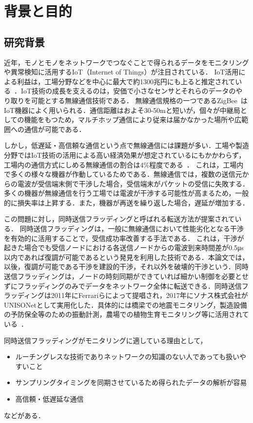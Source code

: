 \chapter{背景と目的}

\section{研究背景}
近年，モノとモノをネットワークでつなぐことで得られるデータをモニタリングや異常検知に活用するIoT（Internet of Things）が注目されている．
IoT活用による利益は，工場分野などを中心に最大で約1300兆円にも上ると推定されている~\cite{IoT}．IoT技術の成長を支えるのは，安価で小さなセンサとそれらのデータのやり取りを可能とする無線通信技術である．
無線通信規格の一つであるZigBee~\cite{zigbee}はIoT機器によく用いられる．通信距離はおよそ30-50\si{\metre}と短いが，個々が中継局としての機能をもつため，マルチホップ通信により従来は届かなかった場所や広範囲への通信が可能である．


しかし，低遅延・高信頼な通信という点で無線通信には課題が多い．工場や製造分野ではIoT技術の活用による高い経済効果が想定されているにもかかわらず，工場内の通信方式にしめる無線通信の割合は4\%程度である~\cite{IoT}．
これは，工場内で多くの様々な機器が作動しているためである．無線通信では，複数の送信元からの電波が受信端末側で干渉した場合，受信端末がパケットの受信に失敗する．多くの機器が無線通信を行う工場では電波が干渉する可能性が高まるため，一般的に損失率は上昇する．また，機器が再送を繰り返した場合，遅延が増加する．

この問題に対し，同時送信フラッディングと呼ばれる転送方法が提案されている．
同時送信フラッディングは，一般に無線通信において性能劣化となる干渉を有効的に活用することで，受信成功率改善する手法である．
これは，干渉が起きた場合でも受信ノードにおける各送信ノードからの電波到来時間差が0.5\si{\micro\second}以内であれば復調が可能であるという発見を利用した技術である．本論文では，以後，復調が可能である干渉を建設的干渉，それ以外を破壊的干渉という．同時送信フラッディングは，ノードの時刻同期ができていれば細かい制御を必要とせずにフラッディングのみでデータをネットワーク全体に転送できる．同時送信フラッディングは2011年にFerrariらによって提唱され，2017年にソナス株式会社がUNISONetとして実用化した．具体的には橋梁での地震モニタリング，製造設備の予防保全等のための振動計測，農場での植物生育モニタリング等に活用されている~\cite{sonas}．

同時送信フラッディングがモニタリングに適している理由として，
\begin{itemize}
    \item ルーチングレスな技術でありネットワークの知識のない人であっても扱いやすいこと
    \item サンプリングタイミングを同期させているため得られたデータの解析が容易
    \item 高信頼・低遅延な通信
\end{itemize}
などがある．

